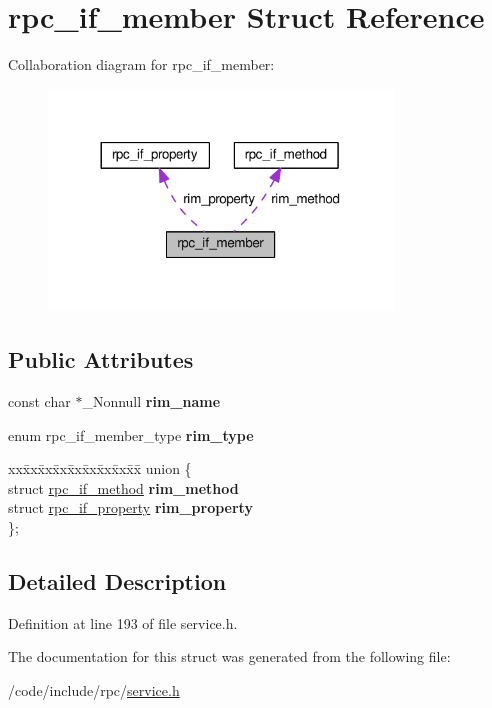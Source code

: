 \hypertarget{structrpc__if__member}{}\section{rpc\+\_\+if\+\_\+member Struct Reference}
\label{structrpc__if__member}


Collaboration diagram for rpc\+\_\+if\+\_\+member\+:
\nopagebreak
\begin{figure}[H]
\begin{center}
\leavevmode
\includegraphics[width=260pt]{structrpc__if__member__coll__graph}
\end{center}
\end{figure}
\subsection*{Public Attributes}
\begin{DoxyCompactItemize}
\item 
const char $\ast$\+\_\+\+Nonnull {\bfseries rim\+\_\+name}\hypertarget{structrpc__if__member_a656607611d627c965972e4153523287e}{}\label{structrpc__if__member_a656607611d627c965972e4153523287e}

\item 
enum rpc\+\_\+if\+\_\+member\+\_\+type {\bfseries rim\+\_\+type}\hypertarget{structrpc__if__member_a0ffdb5e81a707932149376d01c716b10}{}\label{structrpc__if__member_a0ffdb5e81a707932149376d01c716b10}

\item 
\begin{tabbing}
xx\=xx\=xx\=xx\=xx\=xx\=xx\=xx\=xx\=\kill
union \{\\
\>struct \hyperlink{structrpc__if__method}{rpc\_if\_method} {\bfseries rim\_method}\\
\>struct \hyperlink{structrpc__if__property}{rpc\_if\_property} {\bfseries rim\_property}\\
\}; \hypertarget{structrpc__if__member_a7c950b405b6852b3038ae847d0b7e2e0}{}\label{structrpc__if__member_a7c950b405b6852b3038ae847d0b7e2e0}
\\

\end{tabbing}\end{DoxyCompactItemize}


\subsection{Detailed Description}


Definition at line 193 of file service.\+h.



The documentation for this struct was generated from the following file\+:\begin{DoxyCompactItemize}
\item 
/code/include/rpc/\hyperlink{service_8h}{service.\+h}\end{DoxyCompactItemize}
